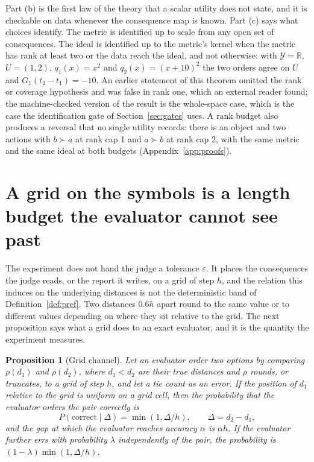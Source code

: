 \documentclass{article}
\newtheorem{proposition}{Proposition}
\theoremstyle{definition}
\theoremstyle{remark}
\newcommand{\Y}{\mathcal{Y}}
\newcommand{\R}{\mathbb{R}}
\begin{document}
Part (b) is the first law of the theory that a scalar utility does not state, and it is checkable on data whenever the consequence map is known.
Part (c) says what choices identify.
The metric is identified up to scale from any open set of consequences.
The ideal is identified up to the metric's kernel when the metric has rank at least two or the data reach the ideal, and not otherwise: with $\Y=\R$, $U=(1,2)$, $q_{1}(x)=x^{2}$ and $q_{2}(x)=(x+10)^{2}$ the two orders agree on $U$ and $G_{1}(t_{2}-t_{1})=-10$.
An earlier statement of this theorem omitted the rank or coverage hypothesis and was false in rank one, which an external reader found; the machine-checked version of the result is the whole-space case, which is the case the identification gate of Section~\ref{sec:gates} uses.
A rank budget also produces a reversal that no single utility records: there is an object and two actions with $b\succ a$ at rank cap 1 and $a\succ b$ at rank cap 2, with the same metric and the same ideal at both budgets (Appendix~\ref{app:proofs}).

\section{A grid on the symbols is a length budget the evaluator cannot see past}
\label{sec:channel}

The experiment does not hand the judge a tolerance $\varepsilon$.
It places the consequences the judge reads, or the report it writes, on a grid of step $h$, and the relation this induces on the underlying distances is not the deterministic band of Definition~\ref{def:pref}.
Two distances $0.6h$ apart round to the same value or to different values depending on where they sit relative to the grid.
The next proposition says what a grid does to an exact evaluator, and it is the quantity the experiment measures.

\begin{proposition}[Grid channel]
\label{prop:channel}
Let an evaluator order two options by comparing $\rho(d_{1})$ and $\rho(d_{2})$, where $d_{1}<d_{2}$ are their true distances and $\rho$ rounds, or truncates, to a grid of step $h$, and let a tie count as an error.
If the position of $d_{1}$ relative to the grid is uniform on a grid cell, then the probability that the evaluator orders the pair correctly is
\[
P(\text{correct}\mid\Delta)=\min(1,\Delta/h),\qquad \Delta=d_{2}-d_{1},
\]
and the gap at which the evaluator reaches accuracy $\alpha$ is $\alpha h$.
If the evaluator further errs with probability $\lambda$ independently of the pair, the probability is $(1-\lambda)\min(1,\Delta/h)$.
\end{proposition}
\end{document}
